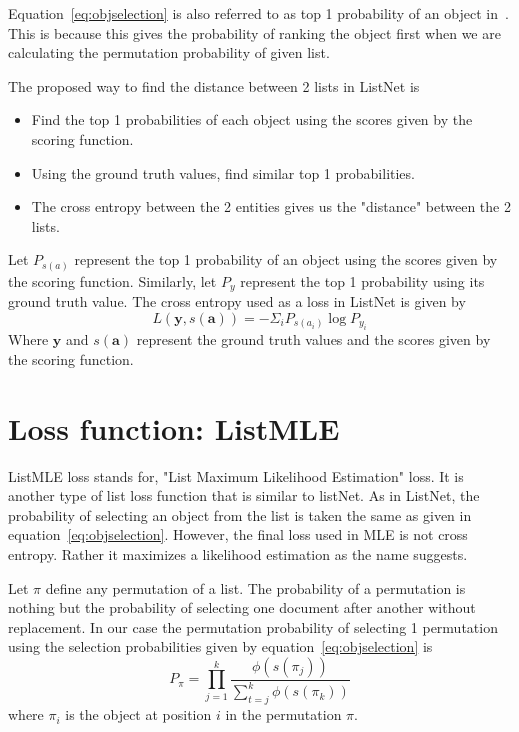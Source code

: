 \documentclass[12pt, twoside, ngerman]{report}
\begin{document}
Equation~\ref{eq:objselection} is also referred to as top 1 probability of an object in~\cite{listwisebetter}.
This is because this gives the probability of ranking the object first when we are calculating the permutation probability of given list.

The proposed way to find the distance between 2 lists in ListNet is
\begin{itemize}
\item Find the top 1 probabilities of each object using the scores given by the scoring function.
\item Using the ground truth values,  find similar top 1 probabilities.
\item The cross entropy between the 2 entities gives us the "distance" between the 2 lists.
\end{itemize}

Let $P_{s(a)}$ represent the top 1 probability of an object using the scores given by the scoring function.
Similarly,   let $P_y$ represent the top 1 probability using its ground truth value.
The cross entropy used as a loss in ListNet is given by
\begin{equation}
L(\textbf{y},  {s(\textbf{a})}) = - \Sigma_i P_{s(a_i)} \log P_{y_i}
\end{equation}
Where $\textbf{y}$ and $s(\textbf{a})$ represent the ground truth values and the scores given by the scoring function.

\section{Loss function: ListMLE}\label{sec:listMLE}

ListMLE loss stands for, "List Maximum Likelihood Estimation" loss.
It is another type of list loss function that is similar to listNet.
As in ListNet,  the probability of selecting an object from the list is taken the same as given in equation~\ref{eq:objselection}.
However,  the final loss used in MLE is not cross entropy.
Rather it maximizes a likelihood estimation as the name suggests.

Let $\pi$ define any permutation of a list.
The probability of a permutation is nothing but the probability of selecting one document after another without replacement.
In our case the permutation probability of selecting 1 permutation using the selection probabilities given by equation~\ref{eq:objselection}  is~\cite{listwisebetter}
\begin{equation}\label{eq:firstMLEequation}
P_{\pi} = \prod\limits_{j=1}^{k} \frac{\phi(s(\pi_j))}{ \sum\limits_{t=j}^k \phi(s(\pi_k))}
\end{equation}
where $\pi_i$ is the object at position $i$ in the permutation $\pi$.
\end{document}
